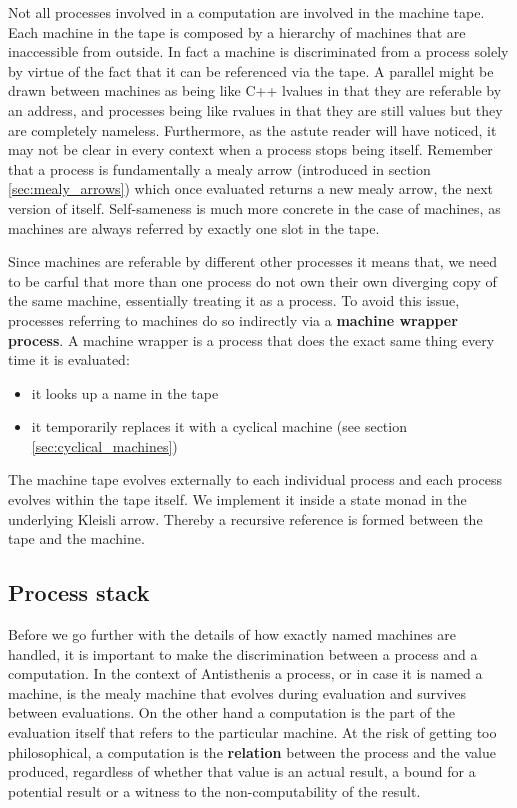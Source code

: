 Not all processes involved in a computation are involved in the
machine tape. Each machine in the tape is composed by a hierarchy of
machines that are inaccessible from outside. In fact a machine is
discriminated from a process solely by virtue of the fact that it can
be referenced via the tape. A parallel might be drawn between machines
as being like C++ lvalues in that they are referable by an address,
and processes being like rvalues in that they are still values but
they are completely nameless. Furthermore, as the astute reader will
have noticed, it may not be clear in every context when a process
stops being itself. Remember that a process is fundamentally a mealy
arrow (introduced in section \ref{sec:mealy_arrows}) which once
evaluated returns a new mealy arrow, the next version of
itself. Self-sameness is much more concrete in the case of machines,
as machines are always referred by exactly one slot in the tape.

Since machines are referable by different other processes it means
that, we need to be carful that more than one process do not own their
own diverging copy of the same machine, essentially treating it as a
process. To avoid this issue, processes referring to machines do so
indirectly via a \textbf{machine wrapper process}. A machine wrapper is a
process that does the exact same thing every time it is evaluated:

\begin{itemize}
\item it looks up a name in the tape
\item it temporarily replaces it with a cyclical machine (see section
  \ref{sec:cyclical_machines})
\end{itemize}

The machine tape evolves externally to each individual process and
each process evolves within the tape itself. We implement it inside a
state monad in the underlying Kleisli arrow. Thereby a recursive
reference is formed between the tape and the machine.
\subsection{Process stack}
\label{sec:process_stack}
Before we go further with the details of how exactly named machines
are handled, it is important to make the discrimination between a
process and a computation. In the context of Antisthenis a process, or
in case it is named a machine, is the mealy machine that evolves
during evaluation and survives between evaluations. On the other hand
a computation is the part of the evaluation itself that refers to the
particular machine. At the risk of getting too philosophical, a
computation is the \textbf{relation} between the process and the value
produced, regardless of whether that value is an actual result, a
bound for a potential result or a witness to the non-computability of
the result.

